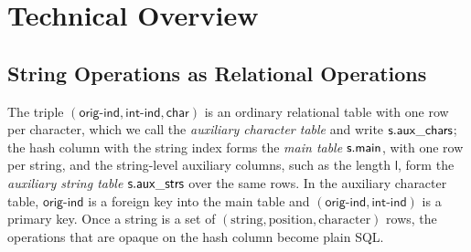 \doclearpage
\section{Technical Overview}
\label{sec:our_techniques}




\subsection{String Operations as Relational Operations}
\label{sec:string-ops-relational}



 The triple $(\mathsf{orig\text{-}ind}, \mathsf{int\text{-}ind}, \mathsf{char})$ is an ordinary relational table with one row per character, which we call the \emph{auxiliary character table} and write $\mathsf{s}.\mathsf{aux\_chars}$; the hash column with the string index forms the \emph{main table} $\mathsf{s}.\mathsf{main}$, with one row per string, and the string-level auxiliary columns, such as the length $\mathsf{l}$, form the \emph{auxiliary string table} $\mathsf{s}.\mathsf{aux\_strs}$ over the same rows. In the auxiliary character table, $\mathsf{orig\text{-}ind}$ is a foreign key into the main table and $(\mathsf{orig\text{-}ind}, \mathsf{int\text{-}ind})$ is a primary key. Once a string is a set of $(\text{string}, \text{position}, \text{character})$ rows, the operations that are opaque on the hash column become plain SQL. 


